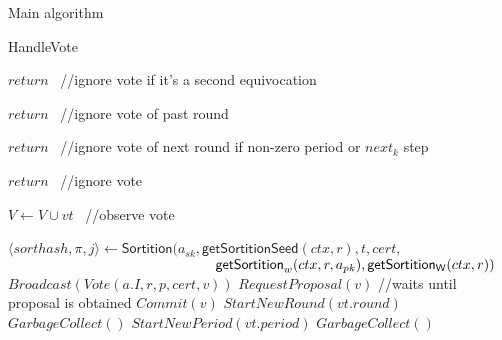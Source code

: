 \documentclass[10pt,a4paper]{article}
\begin{document}
\begin{section}{Main algorithm}
\begin{subsection}{HandleVote}
\begin{algorithm}[H]
\begin{algorithmic}[1]
                \State $return$ \ //ignore vote if it's a second equivocation
            \EndIf

                \State $return$ \ //ignore vote of past round
            \EndIf

                \State $return$ \ //ignore vote of next round if non-zero period or $next_k$ step
            \EndIf

                \State $return$ \ //ignore vote
            \EndIf

            \State $V \gets V \cup vt$ \ //observe vote

                        \State $\langle sorthash, \pi, j\rangle\gets 
                        \mathsf{Sortition}(
                        a_{sk}, 
                        \mathsf{getSortitionSeed}(ctx, r), 
                        t, 
                        cert, $ \newline
                        ${}$ ${\hskip 5.2cm}\mathsf{getSortition}_w(ctx, r, a_{pk}), 
                        \mathsf{getSortition_W}(ctx, r)
                        )$
                            \State $Broadcast(Vote(a.I, r, p, cert, v))$
                        \EndIf
                    \EndFor
                \EndIf
                        \State $RequestProposal(v)$ //waits until proposal is obtained
                    \EndIf
                    \State $Commit(v)$  %
                    \State $StartNewRound(vt.round)$
                    \State $GarbageCollect()$
                \EndIf
            \Else
                    \State $StartNewPeriod(vt.period)$
                    \State $GarbageCollect()$
                \EndIf
            \EndIf


\end{algorithmic}
\end{algorithm}
\end{subsection}
\end{section}
\end{document}
